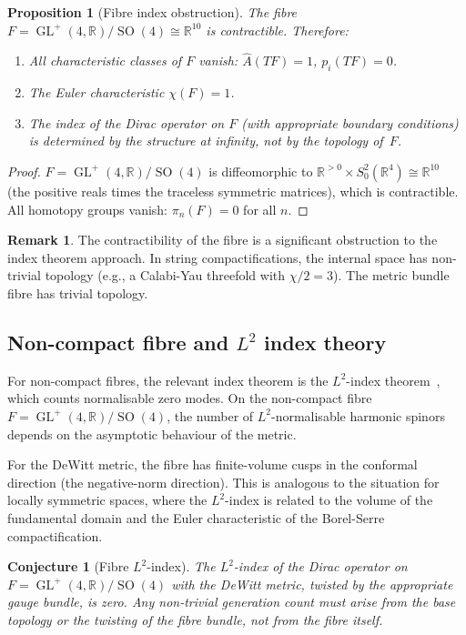 \documentclass[12pt,a4paper]{article}
\newtheorem{proposition}[theorem]{Proposition}
\newtheorem{conjecture}[theorem]{Conjecture}
\theoremstyle{definition}
\newtheorem{remark}[theorem]{Remark}
\newcommand{\GL}{\operatorname{GL}}
\newcommand{\SO}{\operatorname{SO}}
\newcommand{\R}{\mathbb{R}}
\newcommand{\Ahat}{\hat{A}}
\begin{document}
\begin{proposition}[Fibre index obstruction]
\label{prop:fibre_index}
The fibre $F = \GL^+(4,\R)/\SO(4) \cong \R^{10}$ is contractible.
Therefore:
\begin{enumerate}[nosep]
\item All characteristic classes of $F$ vanish: $\Ahat(TF) = 1$, $p_i(TF) = 0$.
\item The Euler characteristic $\chi(F) = 1$.
\item The index of the Dirac operator on $F$ (with appropriate boundary conditions) is determined by the structure at infinity, not by the topology of~$F$.
\end{enumerate}
\end{proposition}

\begin{proof}
$F = \GL^+(4,\R)/\SO(4)$ is diffeomorphic to $\R^{>0} \times S^2_0(\R^4) \cong \R^{10}$ (the positive reals times the traceless symmetric matrices), which is contractible.
All homotopy groups vanish: $\pi_n(F) = 0$ for all $n$.
\end{proof}

\begin{remark}
The contractibility of the fibre is a significant obstruction to the index theorem approach.
In string compactifications, the internal space has non-trivial topology (e.g., a Calabi-Yau threefold with $\chi/2 = 3$).
The metric bundle fibre has trivial topology.
\end{remark}

\subsection{Non-compact fibre and $L^2$ index theory}

For non-compact fibres, the relevant index theorem is the $L^2$-index theorem~\cite{Atiyah1976}, which counts normalisable zero modes.
On the non-compact fibre $F = \GL^+(4,\R)/\SO(4)$, the number of $L^2$-normalisable harmonic spinors depends on the asymptotic behaviour of the metric.

For the DeWitt metric, the fibre has finite-volume cusps in the conformal direction (the negative-norm direction).
This is analogous to the situation for locally symmetric spaces, where the $L^2$-index is related to the volume of the fundamental domain and the Euler characteristic of the Borel-Serre compactification.

\begin{conjecture}[Fibre $L^2$-index]
\label{conj:L2_index}
The $L^2$-index of the Dirac operator on $F = \GL^+(4,\R)/\SO(4)$ with the DeWitt metric, twisted by the appropriate gauge bundle, is zero.
Any non-trivial generation count must arise from the \emph{base} topology or the \emph{twisting} of the fibre bundle, not from the fibre itself.
\end{conjecture}
\end{document}
